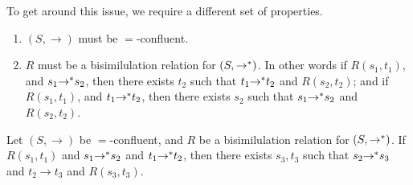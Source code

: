 \documentclass{easychair}
\begin{document}
To get around this issue, we require a different set of properties.
\begin{enumerate}
\item $(S,\rightarrow)$ must be $=$-confluent.
\item $R$ must be a bisimilulation relation for $(S,{\rightarrow}^*)$. In
  other words if $R(s_1,t_1)$, and $s_1 {\rightarrow}^* s_2$, then there
  exists $t_2$ such that $t_1 {\rightarrow}^* t_2$ and $R(s_2,t_2)$; and if
  $R(s_1,t_1)$, and $t_1 {\rightarrow}^* t_2$, then there exists $s_2$ such
  that $s_1 {\rightarrow}^* s_2$ and $R(s_2,t_2)$.
\end{enumerate}

\begin{theorem}
  \label{lem:right-side}
  Let $(S,\rightarrow)$ be $=$-confluent, and $R$ be a bisimilulation relation
  for $(S,{\rightarrow}^*)$. If $R(s_1,t_1)$ and $s_1 {\rightarrow}^*
  s_2$ and $t_1 {\rightarrow}^* t_2$, then there exists $s_3,t_3$ such that
  $s_2 {\rightarrow}^* s_3$ and $t_2 \rightarrow t_3$ and $R(s_3,t_3)$.
\end{theorem}
\end{document}
